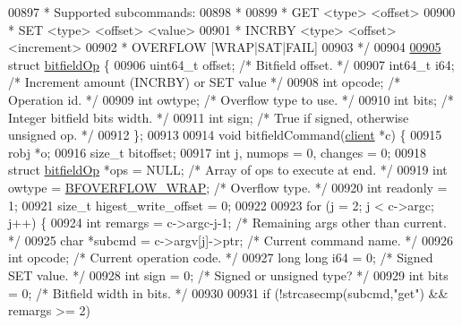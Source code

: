 \begin{DoxyCode}
{00897 \textcolor{comment}{ * Supported subcommands:}
00898 \textcolor{comment}{ *}
00899 \textcolor{comment}{ * GET <type> <offset>}
00900 \textcolor{comment}{ * SET <type> <offset> <value>}
00901 \textcolor{comment}{ * INCRBY <type> <offset> <increment>}
00902 \textcolor{comment}{ * OVERFLOW [WRAP|SAT|FAIL]}
00903 \textcolor{comment}{ */}
00904 
\hyperlink{structbitfieldOp}{00905} \textcolor{keyword}{struct} \hyperlink{structbitfieldOp}{bitfieldOp} \{
00906     uint64\_t offset;    \textcolor{comment}{/* Bitfield offset. */}
00907     int64\_t i64;        \textcolor{comment}{/* Increment amount (INCRBY) or SET value */}
00908     \textcolor{keywordtype}{int} opcode;         \textcolor{comment}{/* Operation id. */}
00909     \textcolor{keywordtype}{int} owtype;         \textcolor{comment}{/* Overflow type to use. */}
00910     \textcolor{keywordtype}{int} bits;           \textcolor{comment}{/* Integer bitfield bits width. */}
00911     \textcolor{keywordtype}{int} sign;           \textcolor{comment}{/* True if signed, otherwise unsigned op. */}
00912 \};
00913 
00914 \textcolor{keywordtype}{void} bitfieldCommand(\hyperlink{structclient}{client} *c) \{
00915     robj *o;
00916     size\_t bitoffset;
00917     \textcolor{keywordtype}{int} j, numops = 0, changes = 0;
00918     \textcolor{keyword}{struct} \hyperlink{structbitfieldOp}{bitfieldOp} *ops = NULL; \textcolor{comment}{/* Array of ops to execute at end. */}
00919     \textcolor{keywordtype}{int} owtype = \hyperlink{bitops_8c_a4ecdfa50fecb0c7c8f11f098d9b808e8}{BFOVERFLOW\_WRAP}; \textcolor{comment}{/* Overflow type. */}
00920     \textcolor{keywordtype}{int} readonly = 1;
00921     size\_t higest\_write\_offset = 0;
00922 
00923     \textcolor{keywordflow}{for} (j = 2; j < c->argc; j++) \{
00924         \textcolor{keywordtype}{int} remargs = c->argc-j-1; \textcolor{comment}{/* Remaining args other than current. */}
00925         \textcolor{keywordtype}{char} *subcmd = c->argv[j]->ptr; \textcolor{comment}{/* Current command name. */}
00926         \textcolor{keywordtype}{int} opcode; \textcolor{comment}{/* Current operation code. */}
00927         \textcolor{keywordtype}{long} \textcolor{keywordtype}{long} i64 = 0;  \textcolor{comment}{/* Signed SET value. */}
00928         \textcolor{keywordtype}{int} sign = 0; \textcolor{comment}{/* Signed or unsigned type? */}
00929         \textcolor{keywordtype}{int} bits = 0; \textcolor{comment}{/* Bitfield width in bits. */}
00930 
00931         \textcolor{keywordflow}{if} (!strcasecmp(subcmd,\textcolor{stringliteral}{"get"}) && remargs >= 2)
}
\end{DoxyCode}
